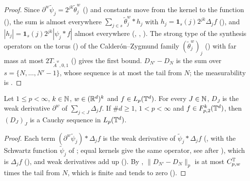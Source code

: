 \begin{proof}
\leanok
Since $\partial^w \tilde\psi_j = 2^{jk} \tilde\theta^w_j$ ()
and constants move from the kernel to the function (), the sum
is almost everywhere $\sum_{j \in s} \tilde\theta^w_j * h_j$ with
$h_j = \mathbf 1_s(j) 2^{jk} \Delta_j f$ (), and
$|h_j| = \mathbf 1_s(j) 2^{jk} |\psi_j * f|$ almost everywhere (,
, ). The strong
type of the synthesis operators on the torus () of the
Calder\'on--Zygmund family $(\tilde\theta^w_j)_j$ () with far
mass at most $2 T_{\tilde A^w,0,1}$ () gives the
first bound.
$D_{N'} - D_N$ is the sum over $s = \{N, \dots, N' - 1\}$, whose sequence is at most the tail
from $N$; the measurability is .
\end{proof}

\begin{lemma}
\label{lem:torus-derivative-partial-sums}
\leanok
{}
Let $1 \leq p < \infty$, $k \in \mathbb{N}$, $w \in (\mathbb{R}^d)^k$ and $f \in L_p(\mathbb{T}^d)$. For every $J \in \mathbb{N}$,
$D_J$ is the weak derivative $\partial^w$ of $\sum_{j < J} \Delta_j f$. If $\#d \geq 1$,
$1 < p < \infty$ and $f \in F^{k}_{p,2}(\mathbb{T}^d)$, then $(D_J)_J$ is a Cauchy sequence in $L_p(\mathbb{T}^d)$.
\end{lemma}

\begin{proof}
\leanok
Each term $(\partial^w \tilde\psi_j) * \Delta_j f$ is the weak derivative of
$\tilde\psi_j * \Delta_j f$ (, with the Schwartz
function $\tilde\psi_j$ of ; equal kernels give the same
operator, see after ), which is $\Delta_j f$
(), and weak derivatives add up
(). By ,
$\|D_{N'} - D_N\|_p$ is at most $C^{\mathbb{T}}_{p,w}$ times the tail from $N$, which is finite and tends
to zero ().
\end{proof}

